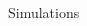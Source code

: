 \documentclass[final,hyperref={pdfpagelabels=false}]{beamer}
\begin{document}
\begin{columns}[t]
\begin{column}{.49\textwidth}
\begin{block}{Simulations}



\end{block}


\end{column}
\end{columns}

\end{document}
